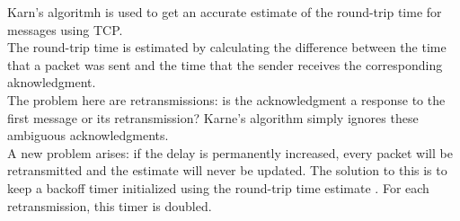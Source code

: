 Karn's algoritmh is used to get an accurate estimate of the round-trip time for messages using TCP. \\
The round-trip time is estimated by calculating the difference between the time that a packet was sent and the time that the sender receives the corresponding aknowledgment. \\
The problem here are retransmissions: is the acknowledgment a response to the first message or its retransmission?
Karne's algorithm simply ignores these ambiguous acknowledgments. \\
A new problem arises: if the delay is permanently increased, every packet will be retransmitted and the estimate will never be updated.
The solution to this is to keep a backoff timer initialized using the round-trip time estimate . For each retransmission, this timer is doubled.
